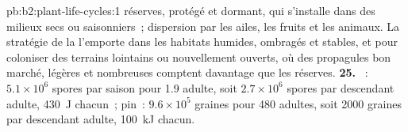 \begin{solution}{pb:b2:plant-life-cycles:1}
réserves, protégé et dormant, qui s'installe dans des milieux secs ou
saisonniers~; dispersion par les ailes, les fruits et les animaux. La
stratégie de la  l'emporte dans les habitats humides, ombragés
et stables, et pour coloniser des terrains lointains ou nouvellement
ouverts, où des propagules bon marché, légères et nombreuses comptent
davantage que les réserves.
\textbf{25.} ~: $5.1\times 10^{6}$ spores par saison pour 1.9
adulte, soit $2.7\times 10^{6}$ spores par descendant adulte,
\qty{430}{J} chacun~; pin~: $9.6\times 10^{5}$ graines pour 480 adultes,
soit \num{2000} graines par descendant adulte, \qty{100}{kJ} chacun.
\end{solution}
